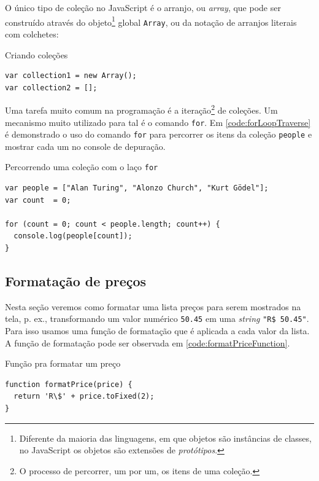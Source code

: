 O único tipo de coleção no JavaScript é o arranjo, ou \emph{array}, que pode ser
construído através do objeto\footnote{Diferente da maioria das linguagens, em que objetos são
instâncias de classes, no JavaScript os objetos são extensões de \emph{protótipos}.} global \texttt{Array}, ou da
notação de arranjos literais com colchetes:

\begin{listing}[htbp]
\caption{Criando coleções}
\begin{verbatim}
var collection1 = new Array();
var collection2 = [];
\end{verbatim}
\end{listing}

Uma tarefa muito comum na programação é a iteração\footnote{O processo de percorrer, um por um, os itens de uma coleção.} de coleções.
Um mecanismo muito utilizado para tal é o comando \texttt{for}. Em
\ref{code:forLoopTraverse} é demonstrado o uso do comando \texttt{for} para
percorrer os itens da coleção \texttt{people} e mostrar cada um no console de
depuração.

\begin{listing}[htbp]
\caption{\label{code:forLoopTraverse}Percorrendo uma coleção com o laço \texttt{for}}
\begin{verbatim}
var people = ["Alan Turing", "Alonzo Church", "Kurt Gödel"];
var count  = 0;

for (count = 0; count < people.length; count++) {
  console.log(people[count]);
}
\end{verbatim}
\end{listing}

\subsection{Formatação de preços}
\label{sec:org2814a11}

Nesta seção veremos como formatar uma lista preços para serem mostrados na
tela, p. ex., transformando um valor numérico \texttt{50.45} em uma \emph{string}
\texttt{"R\$ 50.45"}. Para isso usamos uma função de formatação que é aplicada
a cada valor da lista. A função de formatação pode ser observada em
\ref{code:formatPriceFunction}.

\begin{listing}[htbp]
\caption{\label{code:formatPriceFunction}Função pra formatar um preço}
\begin{verbatim}
function formatPrice(price) {
  return 'R\$' + price.toFixed(2);
}
\end{verbatim}
\end{listing}


